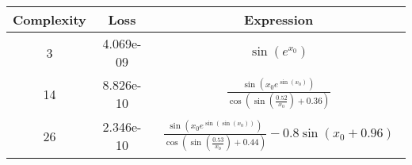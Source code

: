 \begin{center}
        \begin{tabular}{|c|c|c|}
        \hline
        Complexity & Loss & Expression \\
        \hline
        3 & 4.069e-09 & $\begin{aligned}\sin{\left(e^{x_{0}} \right)}\end{aligned}$\\ \hline14 & 8.826e-10 & $\begin{aligned}\frac{\sin{\left(x_{0} e^{\sin{\left(x_{0} \right)}} \right)}}{\cos{\left(\sin{\left(\frac{0.52}{x_{0}} \right)} + 0.36 \right)}}\end{aligned}$\\ \hline26 & 2.346e-10 & $\begin{aligned}\frac{\sin{\left(x_{0} e^{\sin{\left(\sin{\left(x_{0} \right)} \right)}} \right)}}{\cos{\left(\sin{\left(\frac{0.53}{x_{0}} \right)} + 0.44 \right)}} - 0.8 \sin{\left(x_{0} + 0.96 \right)}\end{aligned}$\\ \hline\end{tabular}
        \end{center}
        